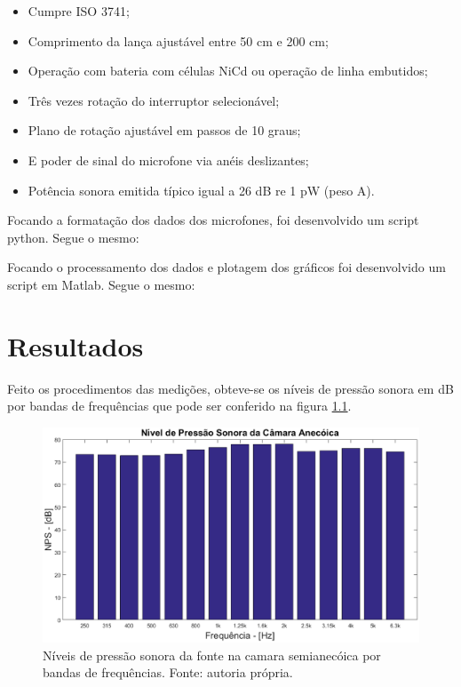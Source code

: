 \begin{itemize}
		\begin{itemize}
			\item Cumpre ISO 3741;
			\item Comprimento da lança ajustável entre 50 cm e 200 cm;
			\item Operação com bateria com células NiCd ou operação de linha embutidos;
			\item Três vezes rotação do interruptor selecionável;
			\item Plano de rotação ajustável em passos de 10 graus;
			\item E poder de sinal do microfone via anéis deslizantes;
			\item Potência sonora emitida típico igual a 26 dB re 1 pW (peso A).
		\end{itemize}
\end{itemize}


Focando a formatação dos dados dos microfones, foi desenvolvido um script python. Segue o mesmo:


Focando o processamento dos dados e plotagem dos gráficos foi desenvolvido um script em Matlab. Segue o mesmo:
%

\chapter{Resultados}\label{resultados}
Feito os procedimentos das medições, obteve-se os níveis de pressão sonora em dB por bandas de frequências que pode ser conferido na figura \ref{figura_3}.
\begin{figure}[h!]
    \hspace{-4.5cm}
    \includegraphics[width=1.6\textwidth]{figuras/P_anecoica.eps}
    \caption{Níveis de pressão sonora da fonte na camara semianecóica por bandas de frequências. Fonte: autoria própria.}
    \label{figura_3}
\end{figure}

